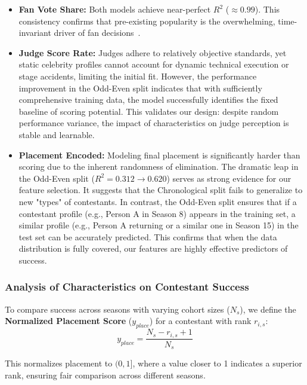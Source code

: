 \begin{itemize}
    \item \textbf{Fan Vote Share:} Both models achieve near-perfect $R^2$ ($\approx 0.99$). This consistency confirms that pre-existing popularity is the overwhelming, time-invariant driver of fan decisions~\cite{gershman2012teaching}.
    \item \textbf{Judge Score Rate:} Judges adhere to relatively objective standards, yet static celebrity profiles cannot account for dynamic technical execution or stage accidents, limiting the initial fit. However, the performance improvement in the Odd-Even split indicates that with sufficiently comprehensive training data, the model successfully identifies the fixed baseline of scoring potential. This validates our design: despite random performance variance, the impact of characteristics on judge perception is stable and learnable.
    \item \textbf{Placement Encoded:} Modeling final placement is significantly harder than scoring due to the inherent randomness of elimination. The dramatic leap in the Odd-Even split ($R^2=0.312 \to 0.620$) serves as strong evidence for our feature selection. It suggests that the Chronological split fails to generalize to new "types" of contestants. In contrast, the Odd-Even split ensures that if a contestant profile (e.g., Person A in Season 8) appears in the training set, a similar profile (e.g., Person A returning or a similar one in Season 15) in the test set can be accurately predicted. This confirms that when the data distribution is fully covered, our features are highly effective predictors of success.
\end{itemize}

\subsubsection{Analysis of Characteristics on Contestant Success}
To compare success across seasons with varying cohort sizes ($N_s$), we define the \textbf{Normalized Placement Score} ($y_{place}$) for a contestant with rank $r_{i,s}$:
\begin{equation}
y_{place} = \frac{N_s - r_{i,s} + 1}{N_s}   
\end{equation}

This normalizes placement to $(0, 1]$, where a value closer to 1 indicates a superior rank, ensuring fair comparison across different seasons.

